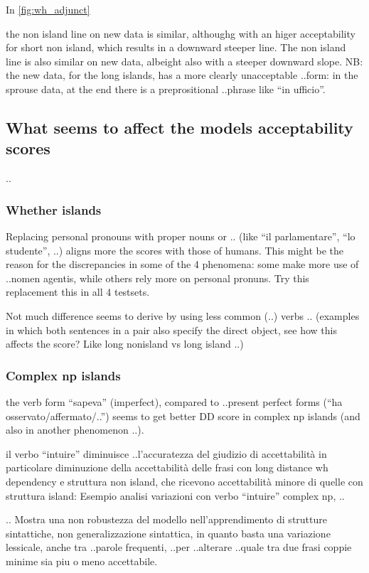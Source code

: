 In \autoref{fig:wh_adjunct}

the non island line on new data is similar, althoughg with an higer acceptability for short non island, which results in a downward steeper line. The non island line is also similar on new data, albeight also with a steeper downward slope.
NB: the new data, for the long islands, has a more clearly unacceptable ..form: in the sprouse data, at the end there is a preprositional ..phrase like “in ufficio”.


\subsection{What seems to affect the models acceptability scores}
..

\subsubsection{Whether islands}
Replacing personal pronouns with proper nouns or .. (like “il parlamentare”, “lo studente”, ..) aligns more the scores with those of humans.
This might be the reason for the discrepancies in some of the 4 phenomena: some make more use of ..nomen agentis, while others rely more on personal pronuns.
Try this replacement this in all 4 testsets.

Not much difference seems to derive by using less common (..) verbs .. 
(examples in which both sentences in a pair also specify the direct object, see how this affects the score? Like long nonisland vs long island ..)

\subsubsection{Complex np islands}
the verb form “sapeva” (imperfect), compared to ..present perfect forms (“ha osservato/affermato/..”) seems to get better DD score in complex np islands (and also in another phenomenon ..).

il verbo “intuire” diminuisce ..l’accuratezza del giudizio di accettabilità
in particolare diminuzione della accettabilità delle frasi con long distance wh dependency e struttura non island, che ricevono accettabilità minore di quelle con struttura island:
Esempio analisi variazioni con verbo “intuire” complex np, ..

..
Mostra una non robustezza del modello nell’apprendimento di strutture sintattiche, non generalizzazione sintattica, in quanto basta una variazione lessicale, anche tra ..parole frequenti, ..per ..alterare ..quale tra due frasi coppie minime sia piu o meno accettabile.

